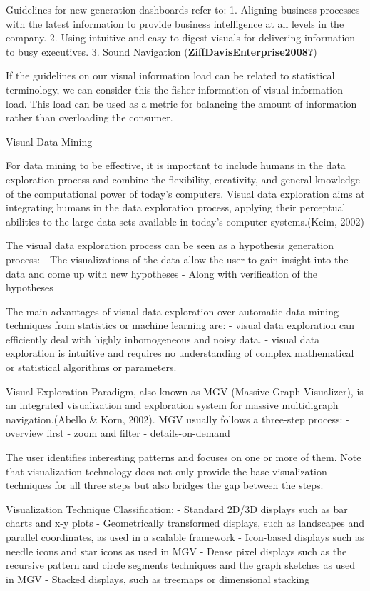 \documentclass[print]{nuthesis}
\begin{document}
Guidelines for new generation dashboards refer to:
1. Aligning business processes with the latest information to provide business intelligence at all levels in the company.
2. Using intuitive and easy-to-digest visuals for delivering information to busy executives.
3. Sound Navigation
(\textbf{ZiffDavisEnterprise2008?})

If the guidelines on our visual information load can be related to statistical terminology, we can consider this the fisher information of visual information load. This load can be used as a metric for balancing the amount of information rather than overloading the consumer.

Visual Data Mining

For data mining to be effective, it is important to include humans in the data exploration process and combine the flexibility, creativity, and general knowledge of the computational power of today's computers. Visual data exploration aims at integrating humans in the data exploration process, applying their perceptual abilities to the large data sets available in today's computer systems.(Keim, 2002)

The visual data exploration process can be seen as a hypothesis generation process:
- The visualizations of the data allow the user to gain insight into the data and come up with new hypotheses
- Along with verification of the hypotheses

The main advantages of visual data exploration over automatic data mining techniques from statistics or machine learning are:
- visual data exploration can efficiently deal with highly inhomogeneous and noisy data.
- visual data exploration is intuitive and requires no understanding of complex mathematical or statistical algorithms or parameters.

Visual Exploration Paradigm, also known as MGV (Massive Graph Visualizer), is an integrated visualization and exploration system for massive multidigraph navigation.(Abello \& Korn, 2002). MGV usually follows a three-step process:
- overview first
- zoom and filter
- details-on-demand

The user identifies interesting patterns and focuses on one or more of them. Note that visualization technology does not only provide the base visualization techniques for all three steps but also bridges the gap between the steps.

Visualization Technique Classification:
- Standard 2D/3D displays such as bar charts and x-y plots
- Geometrically transformed displays, such as landscapes and parallel coordinates, as used in a scalable framework
- Icon-based displays such as needle icons and star icons as used in MGV
- Dense pixel displays such as the recursive pattern and circle segments techniques and the graph sketches as used in MGV
- Stacked displays, such as treemaps or dimensional stacking
\end{document}
